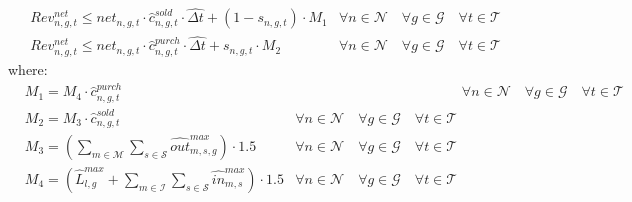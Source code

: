 \documentclass{article}
\newcommand{\cT}{{\mathcal T}}
\newcommand{\cM}{{\mathcal M}}
\newcommand{\cI}{{\mathcal I}}
\newcommand{\cS}{{\mathcal S}}
\newcommand{\cN}{{\mathcal N}}
\newcommand{\cG}{{\mathcal G}}
\begin{document}
{\begin{align}
		& Rev_{n,g,t}^{net} \leq net_{n,g,t} \cdot \hat{c}_{n,g,t}^{sold} \cdot \hat{\Delta t} + (1-s_{n,g,t}) \cdot M_{1}&\forall n \in \cN \quad \forall g \in \cG \quad \forall t \in \cT \label{eq:Net_3}\\
		& Rev_{n,g,t}^{net} \leq net_{n,g,t} \cdot \hat{c}_{n,g,t}^{purch} \cdot \hat{\Delta t} + s_{n,g,t} \cdot M_{2} &\forall n \in \cN \quad \forall g \in \cG \quad \forall t \in \cT \label{eq:Net_4}
		\end{align}
		where: 
		\begin{align}
		& M_{1} = M_{4} \cdot \hat{c}_{n,g,t}^{purch} & \hspace{5cm} \forall n \in \cN \quad \forall g \in \cG \quad \forall t \in \cT \label{eq:M1}\\
		& M_{2} = M_{3} \cdot \hat{c}_{n,g,t}^{sold} &\forall n \in \cN \quad \forall g \in \cG \quad \forall t \in \cT \label{eq:M2}\\
		& M_{3} = \left( \sum_{m \in \cM} \sum_{s \in \cS} \hat{out}_{m,s,g}^{max} \right) \cdot 1.5 & \forall n \in \cN \quad \forall g \in \cG \quad \forall t \in \cT \label{eq:M3}\\
		& M_{4} = \left( \hat{L}_{l,g}^{max} + \sum_{m \in \cI} \sum_{s \in \cS} \hat{in}_{m,s}^{max} \right) \cdot 1.5 & \forall n \in \cN \quad \forall g \in \cG \quad \forall t \in \cT \label{eq:M4}
		\end{align}	
\begin{comment}
		\begin{align}
		& el_{t}^{grid} \geq (s_{t} - 1) \cdot M_{4, t}& \hspace{8cm} \forall t \in \cT \label{eq:Elgrid_1}\\
		& el_{t}^{grid} \leq s_{t} \cdot M_{3, t}& \hspace{8cm} \forall t \in \cT \label{eq:Elgrid_2}\\
		& El_{t}^{grid} \leq el_{t}^{grid} \cdot \hat{c}_{t}^{el,sold} + (1-s_t) \cdot M_{1, t}& \hspace{5cm} \forall t \in \cT \label{eq:Elgrid_3}\\
		& El_{t}^{grid} \leq el_{t}^{grid} \cdot \hat{c}_{t}^{el,purch} + s_t \cdot M_{2, t}& \hspace{5cm} \forall t \in \cT \label{eq:Elgrid_4}
		\end{align}
		where: 
		\begin{align}
		& M_{1,t} = M_{4,t} \cdot \hat{c}_{t}^{el,purch} \hspace{11cm} \forall t \in \cT \label{eq:M1}\\

\end{comment}}
\end{document}
